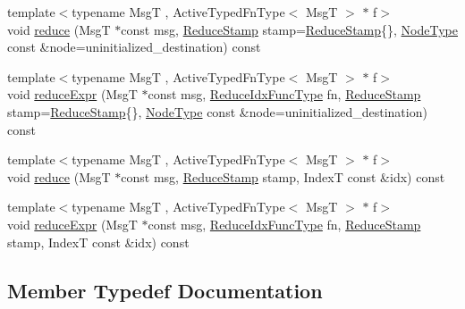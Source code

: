 \begin{DoxyCompactItemize}
\item 
{\footnotesize template$<$typename MsgT , Active\+Typed\+Fn\+Type$<$ Msg\+T $>$ $\ast$ f$>$ }\\void \hyperlink{structvt_1_1vrt_1_1collection_1_1_reducable_a12424df1d19193eb084e5ee2686502a2}{reduce} (MsgT $\ast$const msg, \hyperlink{structvt_1_1vrt_1_1collection_1_1_reducable_a19f80baf23f36dad4948ef07322fd0cb}{Reduce\+Stamp} stamp=\hyperlink{structvt_1_1vrt_1_1collection_1_1_reducable_a19f80baf23f36dad4948ef07322fd0cb}{Reduce\+Stamp}\{\}, \hyperlink{namespacevt_a866da9d0efc19c0a1ce79e9e492f47e2}{Node\+Type} const \&node=uninitialized\+\_\+destination) const
\item 
{\footnotesize template$<$typename MsgT , Active\+Typed\+Fn\+Type$<$ Msg\+T $>$ $\ast$ f$>$ }\\void \hyperlink{structvt_1_1vrt_1_1collection_1_1_reducable_a7b9f5cc1f2155c547eef9af0c5149220}{reduce\+Expr} (MsgT $\ast$const msg, \hyperlink{structvt_1_1vrt_1_1collection_1_1_reducable_a9f5a6c385efafe1fa52937f4809a9486}{Reduce\+Idx\+Func\+Type} fn, \hyperlink{structvt_1_1vrt_1_1collection_1_1_reducable_a19f80baf23f36dad4948ef07322fd0cb}{Reduce\+Stamp} stamp=\hyperlink{structvt_1_1vrt_1_1collection_1_1_reducable_a19f80baf23f36dad4948ef07322fd0cb}{Reduce\+Stamp}\{\}, \hyperlink{namespacevt_a866da9d0efc19c0a1ce79e9e492f47e2}{Node\+Type} const \&node=uninitialized\+\_\+destination) const
\item 
{\footnotesize template$<$typename MsgT , Active\+Typed\+Fn\+Type$<$ Msg\+T $>$ $\ast$ f$>$ }\\void \hyperlink{structvt_1_1vrt_1_1collection_1_1_reducable_a1e6844e0d307172d4121de2becee4b6b}{reduce} (MsgT $\ast$const msg, \hyperlink{structvt_1_1vrt_1_1collection_1_1_reducable_a19f80baf23f36dad4948ef07322fd0cb}{Reduce\+Stamp} stamp, IndexT const \&idx) const
\item 
{\footnotesize template$<$typename MsgT , Active\+Typed\+Fn\+Type$<$ Msg\+T $>$ $\ast$ f$>$ }\\void \hyperlink{structvt_1_1vrt_1_1collection_1_1_reducable_a8ab00b521ff7defd6ac2a864a08fc50d}{reduce\+Expr} (MsgT $\ast$const msg, \hyperlink{structvt_1_1vrt_1_1collection_1_1_reducable_a9f5a6c385efafe1fa52937f4809a9486}{Reduce\+Idx\+Func\+Type} fn, \hyperlink{structvt_1_1vrt_1_1collection_1_1_reducable_a19f80baf23f36dad4948ef07322fd0cb}{Reduce\+Stamp} stamp, IndexT const \&idx) const
\end{DoxyCompactItemize}


\subsection{Member Typedef Documentation}
\mbox{\label{structvt_1_1vrt_1_1collection_1_1_reducable_a9f5a6c385efafe1fa52937f4809a9486}} 
